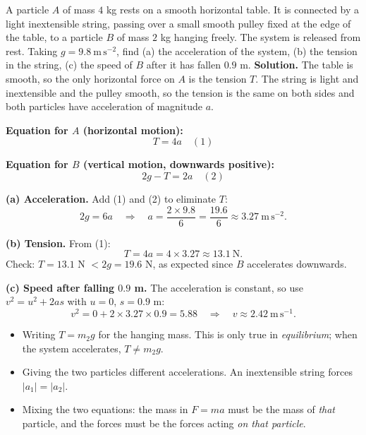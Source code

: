 \documentclass[11pt]{article}
\begin{document}
\begin{exoresolu}
A particle $A$ of mass $4$ kg rests on a smooth horizontal table. It is connected by a light inextensible string, passing over a small smooth pulley fixed at the edge of the table, to a particle $B$ of mass $2$ kg hanging freely. The system is released from rest. Taking $g = 9.8\ \mathrm{m\,s^{-2}}$, find (a) the acceleration of the system, (b) the tension in the string, (c) the speed of $B$ after it has fallen $0.9$ m.
\tcblower
\textbf{Solution.} The table is smooth, so the only horizontal force on $A$ is the tension $T$. The string is light and inextensible and the pulley smooth, so the tension is the same on both sides and both particles have acceleration of magnitude $a$.

\textbf{Equation for $A$ (horizontal motion):}
\[ T = 4a \quad (1) \]

\textbf{Equation for $B$ (vertical motion, downwards positive):}
\[ 2g - T = 2a \quad (2) \]

\textbf{(a) Acceleration.} Add (1) and (2) to eliminate $T$:
\[ 2g = 6a \quad\Longrightarrow\quad a = \frac{2 \times 9.8}{6} = \frac{19.6}{6} \approx 3.27\ \mathrm{m\,s^{-2}}. \]

\textbf{(b) Tension.} From (1):
\[ T = 4a = 4 \times 3.27 \approx 13.1\ \mathrm{N}. \]
Check: $T = 13.1$ N $< 2g = 19.6$ N, as expected since $B$ accelerates downwards.

\textbf{(c) Speed after falling $0.9$ m.} The acceleration is constant, so use $v^2 = u^2 + 2as$ with $u = 0$, $s = 0.9$ m:
\[ v^2 = 0 + 2 \times 3.27 \times 0.9 = 5.88 \quad\Longrightarrow\quad v \approx 2.42\ \mathrm{m\,s^{-1}}. \]
\end{exoresolu}

\begin{attention}
\begin{itemize}
\item Writing $T = m_2 g$ for the hanging mass. This is only true in \emph{equilibrium}; when the system accelerates, $T \neq m_2 g$.
\item Giving the two particles different accelerations. An inextensible string forces $|a_1| = |a_2|$.
\item Mixing the two equations: the mass in $F = ma$ must be the mass of \emph{that} particle, and the forces must be the forces acting \emph{on that particle}.
\end{itemize}
\end{attention}
\end{document}
